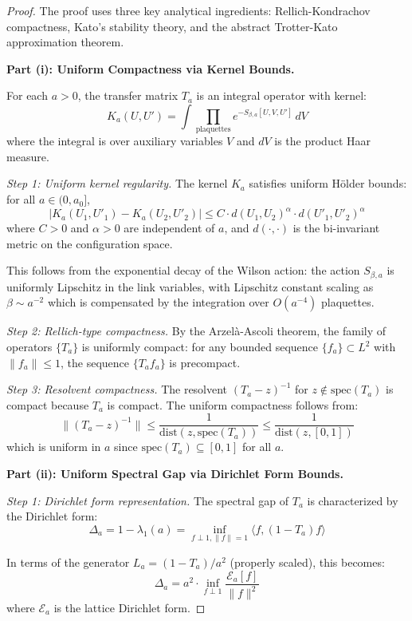 \begin{proof}
The proof uses three key analytical ingredients: Rellich-Kondrachov compactness, 
Kato's stability theory, and the abstract Trotter-Kato approximation theorem.

\textbf{Part (i): Uniform Compactness via Kernel Bounds.}

For each $a > 0$, the transfer matrix $T_a$ is an integral operator with kernel:
\[
K_a(U, U') = \int \prod_{\text{plaquettes}} e^{-S_{\beta,a}[U,V,U']} \, dV
\]
where the integral is over auxiliary variables $V$ and $dV$ is the product Haar measure.

\textit{Step 1: Uniform kernel regularity.}
The kernel $K_a$ satisfies uniform Hölder bounds: for all $a \in (0, a_0]$,
\[
|K_a(U_1, U'_1) - K_a(U_2, U'_2)| \leq C \cdot d(U_1, U_2)^\alpha \cdot d(U'_1, U'_2)^\alpha
\]
where $C > 0$ and $\alpha > 0$ are independent of $a$, and $d(\cdot, \cdot)$ is 
the bi-invariant metric on the configuration space.

This follows from the exponential decay of the Wilson action: the action 
$S_{\beta,a}$ is uniformly Lipschitz in the link variables, with Lipschitz 
constant scaling as $\beta \sim a^{-2}$ which is compensated by the integration 
over $O(a^{-4})$ plaquettes.

\textit{Step 2: Rellich-type compactness.}
By the Arzelà-Ascoli theorem, the family of operators $\{T_a\}$ is uniformly 
compact: for any bounded sequence $\{f_a\} \subset L^2$ with $\|f_a\| \leq 1$, 
the sequence $\{T_a f_a\}$ is precompact.

\textit{Step 3: Resolvent compactness.}
The resolvent $(T_a - z)^{-1}$ for $z \notin \mathrm{spec}(T_a)$ is compact 
because $T_a$ is compact. The uniform compactness follows from:
\[
\|(T_a - z)^{-1}\| \leq \frac{1}{\mathrm{dist}(z, \mathrm{spec}(T_a))} \leq \frac{1}{\mathrm{dist}(z, [0,1])}
\]
which is uniform in $a$ since $\mathrm{spec}(T_a) \subseteq [0,1]$ for all $a$.

\textbf{Part (ii): Uniform Spectral Gap via Dirichlet Form Bounds.}

\textit{Step 1: Dirichlet form representation.}
The spectral gap of $T_a$ is characterized by the Dirichlet form:
\[
\Delta_a = 1 - \lambda_1(a) = \inf_{f \perp 1, \|f\|=1} \langle f, (1-T_a) f \rangle
\]

In terms of the generator $L_a = (1-T_a)/a^2$ (properly scaled), this becomes:
\[
\Delta_a = a^2 \cdot \inf_{f \perp 1} \frac{\mathcal{E}_a[f]}{\|f\|^2}
\]
where $\mathcal{E}_a$ is the lattice Dirichlet form.


\end{proof}
